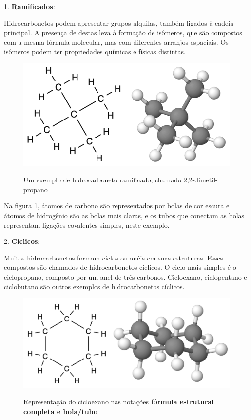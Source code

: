 \documentclass[a4paper,12pt]{book}
\begin{document}
1. \textbf{Ramificados}:

Hidrocarbonetos podem apresentar grupos alquilas, também ligados à cadeia principal. A presença de destas leva à formação de isômeros, que são compostos com a mesma fórmula molecular, mas com diferentes arranjos espaciais. Os isômeros podem ter propriedades químicas e físicas distintas.

\begin{figure}[h]\centering
\caption{Um exemplo de hidrocarboneto ramificado, chamado 2,2-dimetil-propano}
\includegraphics[scale=0.35]{imagens/neopentano.png}
\label{fig:ramificado}\vspace{0.5cm}\end{figure}

Na figura \ref{fig:ramificado}, átomos de carbono são representados por bolas de cor escura e átomos de hidrogênio são as bolas mais claras, e os tubos que conectam as bolas representam ligações covalentes simples, neste exemplo.

2. \textbf{Cíclicos}:

Muitos hidrocarbonetos formam ciclos ou anéis em suas estruturas. Esses compostos são chamados de hidrocarbonetos cíclicos. O ciclo mais simples é o ciclopropano, composto por um anel de três carbonos. Cicloexano, ciclopentano e ciclobutano são outros exemplos de hidrocarbonetos cíclicos.

\begin{figure}[h]\centering
\caption{Representação do cicloexano nas notações \textbf{fórmula estrutural completa e bola/tubo}}
\includegraphics[scale=0.35]{imagens/cicloexano.png}
\label{fig:cicloexano}\vspace{0.5cm}\end{figure}
\end{document}
